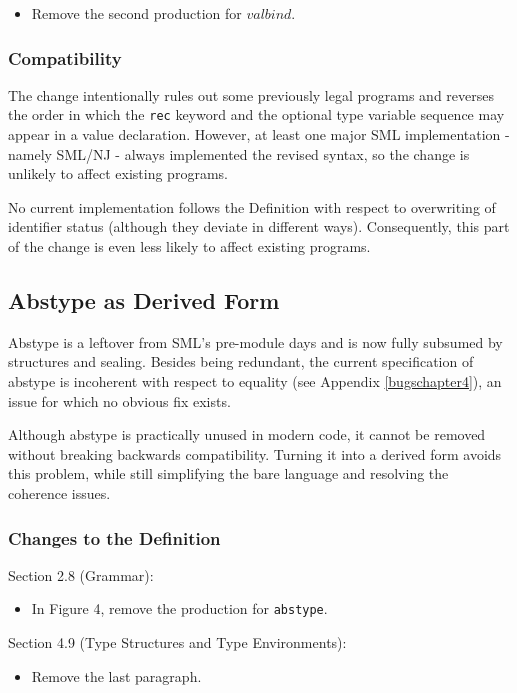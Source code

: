 \documentclass[twoside,titlepage]{article}
\begin{document}
\begin{appendix}
\begin{itemize}
\item Remove the second production for $\mathit{valbind}$.
\end{itemize}

\subsubsection*{Compatibility}

The change intentionally rules out some previously legal programs and reverses the order in which the {\tt rec} keyword and the optional type variable sequence may appear in a value declaration. However, at least one major SML implementation - namely SML/NJ - always implemented the revised syntax, so the change is unlikely to affect existing programs.

No current implementation follows the Definition with respect to overwriting of identifier status (although they deviate in different ways). Consequently, this part of the change is even less likely to affect existing programs.


\subsection{Abstype as Derived Form}
\label{ext-abstype}

Abstype is a leftover from SML's pre-module days and is now fully subsumed by structures and sealing. Besides being redundant, the current specification of abstype is incoherent with respect to equality (see Appendix \ref{bugschapter4}), an issue for which no obvious fix exists.

Although abstype is practically unused in modern code, it cannot be removed without breaking backwards compatibility. Turning it into a derived form avoids this problem, while still simplifying the bare language and resolving the coherence issues.

\subsubsection*{Changes to the Definition}

Section 2.8 (Grammar):
\begin{itemize}
\item In Figure 4, remove the production for {\tt abstype}.
\end{itemize}

Section 4.9 (Type Structures and Type Environments):
\begin{itemize}
\item Remove the last paragraph.
\end{itemize}


\end{appendix}
\end{document}
